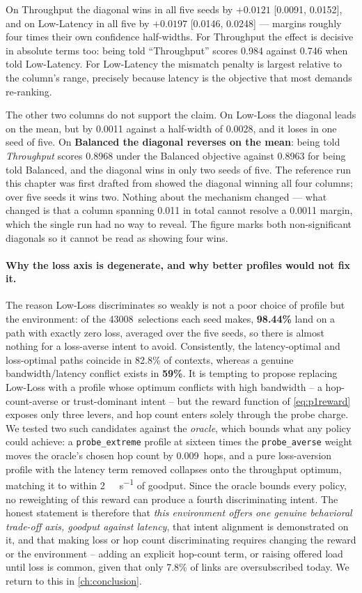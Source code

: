 On Throughput the diagonal wins in all five seeds by $+0.0121$ [0.0091, 0.0152], and on Low-Latency in
all five by $+0.0197$ [0.0146, 0.0248] --- margins roughly four times their own confidence half-widths.
For Throughput the effect is decisive in absolute terms too: being told ``Throughput'' scores 0.984
against 0.746 when told Low-Latency. For Low-Latency the mismatch penalty is largest relative to the
column's range, precisely because latency is the objective that most demands re-ranking.

The other two columns do not support the claim. On Low-Loss
the diagonal leads on the mean, but by 0.0011 against a half-width of 0.0028, and it loses in one seed of
five. On \textbf{Balanced the diagonal reverses on the mean}: being told \emph{Throughput} scores 0.8968
under the Balanced objective against 0.8963 for being told Balanced, and the diagonal wins in only two
seeds of five. The reference run this chapter was first drafted from showed the diagonal winning all four
columns; over five seeds it wins two. Nothing about the mechanism changed --- what changed is that a
column spanning 0.011 in total cannot resolve a 0.0011 margin, which the single run had no way to reveal.
The figure marks both non-significant diagonals so it cannot be read as showing four wins.

\paragraph{Why the loss axis is degenerate, and why better profiles would not fix it.} The reason
Low-Loss discriminates so weakly is not a poor choice of profile but the environment: of the
43008~selections each seed makes, \textbf{98.44\%} land on a path with exactly zero loss, averaged over
the five seeds, so there is almost nothing for a loss-averse intent to avoid. Consistently, the latency-optimal and loss-optimal paths coincide in 82.8\%
of contexts, whereas a genuine bandwidth/latency conflict exists in \textbf{59\%}. It is tempting to
propose replacing Low-Loss with a profile whose optimum conflicts with high bandwidth -- a hop-count-averse
or trust-dominant intent -- but the reward function of \cref{eq:p1reward} exposes only three levers, and
hop count enters solely through the probe charge. We tested two such candidates against the
\emph{oracle}, which bounds what any policy could achieve: a \texttt{probe\_extreme} profile at sixteen
times the \texttt{probe\_averse} weight moves the oracle's chosen hop count by 0.009~hops, and a pure
loss-aversion profile with the latency term removed collapses onto the throughput optimum, matching it to
within \SI{2}{\mega\bit\per\second} of goodput. Since the oracle bounds every policy, no reweighting of
this reward can produce a fourth discriminating intent. The honest statement is therefore that
\emph{this environment offers one genuine behavioral trade-off axis, goodput against latency}, that
intent alignment is demonstrated on it, and that making loss or hop count discriminating requires
changing the reward or the environment -- adding an explicit hop-count term, or raising offered load until
loss is common, given that only 7.8\% of links are oversubscribed today. We return to this in
\cref{ch:conclusion}.


